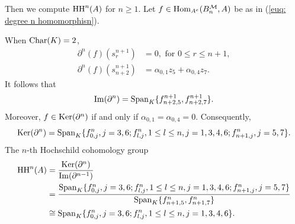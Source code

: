 \documentclass[10pt, reqno]{amsart}
\theoremstyle{definition}
\theoremstyle{remark}
\numberwithin{equation}{section}
\begin{document}
Then we compute \(\mathrm{HH}^n(A)\) for \(n\ge 1\). Let \(f \in \mathrm{Hom}_{A^e}(B_n^{\mathcal{M}}, A)\) be as in (\ref{euq: degree n homomorphisn}). 

When \(\mathrm{Char}(K)=2\), 
\[\begin{aligned}
     \partial^n(f)(s_r^{n+1}) &= 0, \text{ for } 0\le r \le n+1, \\
     \partial^n(f)(s_{n+2}^{n+1}) &=\alpha_{0,1} z_5+\alpha_{0,4}z_7.    
\end{aligned}\]
It follows that \[\mathrm{Im}(\partial^n)= \mathrm{Span}_K \{f_{n+2,5}^{n+1}, f_{n+2,7}^{n+1}\}.\] 
Moreover, \(f \in \mathrm{Ker}(\partial^n)\) if and only if \(\alpha_{0,1}= \alpha_{0,4}=0\). Consequently,
\[\mathrm{Ker}(\partial^n)= \mathrm{Span}_K \{f_{0,j}^n, j=3,6; f_{l,j}^n, 1 \le l \le n, j=1,3,4,6; f_{n+1,j}^n, j=5,7 \}.
\]
The \(n\)-th Hochschild cohomology group
\[\begin{aligned}
    \mathrm{HH}^n(A) &= \frac{\mathrm{Ker}(\partial^n)}{\mathrm{Im}(\partial^{n-1})}\\
    &=\frac{\mathrm{Span}_K \{f_{0,j}^n, j=3,6; f_{l,j}^n, 1 \le l \le n, j=1,3,4,6; f_{n+1,j}^n, j=5,7 \}}{\mathrm{Span}_K \{f_{n+1,5}^n, f_{n+1,7}^n\}} \\
    &\cong \mathrm{Span}_K \{f_{0,j}^n, j=3,6; f_{l,j}^n, 1 \le l \le n, j=1,3,4,6\}.
\end{aligned}\]
\end{document}
